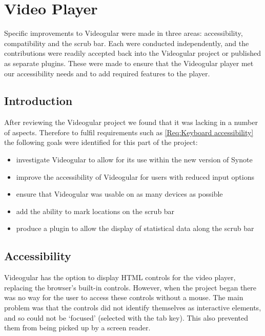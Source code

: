 
\chapter{Video Player}
\label{Chapter:Video Player}

\begin{preamble}
	Specific improvements to \gls{Videogular} were made in three areas: accessibility, compatibility and the scrub bar. Each were conducted independently, and the contributions were readily accepted back into the \gls{Videogular} project or published as separate plugins. These were made to ensure that the \gls{Videogular} player met our accessibility needs and to add required features to the player.
\end{preamble}

\section{Introduction}

After reviewing the \gls{Videogular} project we found that it was lacking in a number of aspects. Therefore to fulfil requirements such as \cref{Req:Keyboard accessibility} the following goals were identified for this part of the project:

\begin{itemize}
	\item investigate \gls{Videogular} to allow for its use within the new version of Synote
	\item improve the accessibility of \gls{Videogular} for users with reduced input options
	\item ensure that \gls{Videogular} was usable on as many devices as possible
	\item add the ability to mark locations on the \gls{scrub bar}
	\item produce a plugin to allow the display of statistical data along the \gls{scrub bar}
\end{itemize}

\section{Accessibility}
\label{Section:Accessibility}
\gls{Videogular} has the option to display HTML controls for the video player, replacing the browser's built-in controls. However, when the project began there was no way for the user to access these controls without a mouse. The main problem was that the controls did not identify themselves as interactive elements, and so could not be `focused' (selected with the tab key). This also prevented them from being picked up by a screen reader.

